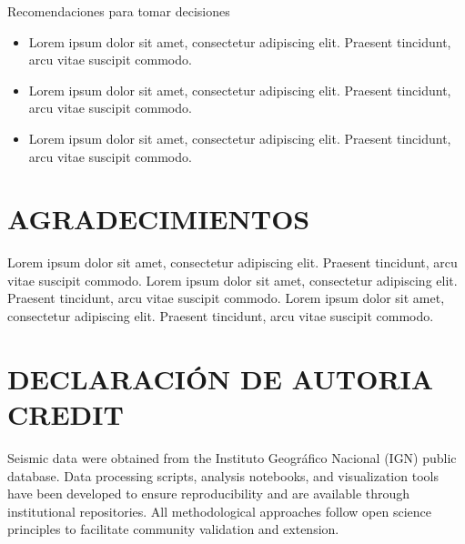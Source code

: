 \documentclass[
  spanish,
  letterpaper,
]{book}
\providecommand{\tightlist}{%
  \setlength{\itemsep}{0pt}\setlength{\parskip}{0pt}}
\begin{document}
\begin{tcolorbox}[enhanced jigsaw, colframe=quarto-callout-important-color-frame, rightrule=.15mm, toprule=.15mm, arc=.35mm, opacityback=0, leftrule=.75mm, breakable, left=2mm, bottomrule=.15mm, colback=white]

Recomendaciones para tomar decisiones

\begin{itemize}
\tightlist
\item
  Lorem ipsum dolor sit amet, consectetur adipiscing elit. Praesent
  tincidunt, arcu vitae suscipit commodo.
\item
  Lorem ipsum dolor sit amet, consectetur adipiscing elit. Praesent
  tincidunt, arcu vitae suscipit commodo.
\item
  Lorem ipsum dolor sit amet, consectetur adipiscing elit. Praesent
  tincidunt, arcu vitae suscipit commodo.
\end{itemize}

\end{tcolorbox}


\chapter{AGRADECIMIENTOS}\label{agradecimientos}

Lorem ipsum dolor sit amet, consectetur adipiscing elit. Praesent
tincidunt, arcu vitae suscipit commodo. Lorem ipsum dolor sit amet,
consectetur adipiscing elit. Praesent tincidunt, arcu vitae suscipit
commodo. Lorem ipsum dolor sit amet, consectetur adipiscing elit.
Praesent tincidunt, arcu vitae suscipit commodo.


\chapter{DECLARACIÓN DE AUTORIA
CREDIT}\label{declaraciuxf3n-de-autoria-credit}

Seismic data were obtained from the Instituto Geográfico Nacional (IGN)
public database. Data processing scripts, analysis notebooks, and
visualization tools have been developed to ensure reproducibility and
are available through institutional repositories. All methodological
approaches follow open science principles to facilitate community
validation and extension.

\end{document}
